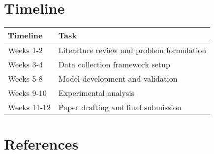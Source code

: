 \documentclass[11pt]{article}
\begin{document}
\section{Timeline}
\begin{tabular}{@{}ll@{}}
\toprule
\textbf{Timeline} & \textbf{Task} \\ 
\midrule
Weeks 1-2 & Literature review and problem formulation \\
Weeks 3-4 & Data collection framework setup \\
Weeks 5-8 & Model development and validation \\
Weeks 9-10 & Experimental analysis \\
Weeks 11-12 & Paper drafting and final submission \\
\bottomrule
\end{tabular}

\section*{References}
\nocite{*}



\hypersetup{
    linkcolor=blue,
    citecolor=red,
    urlcolor=magenta
}
\end{document}

